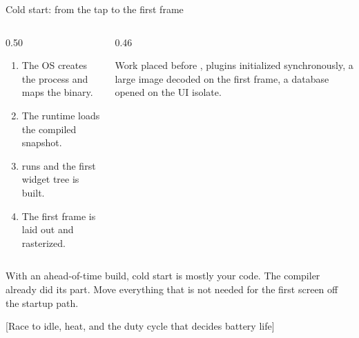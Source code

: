 \documentclass[10pt,aspectratio=169,t]{beamer}
\begin{document}
\begin{frame}[eyebrow=Compilation]{Cold start: from the tap to the first frame}
  \vskip 2mm
  \begin{columns}[T]
    \begin{column}{0.50\textwidth}
      \begin{enumerate}
        \item The OS creates the process and maps the binary.
        \item The runtime loads the compiled snapshot.
        \item {} runs and the first widget tree is built.
        \item The first frame is laid out and rasterized.
      \end{enumerate}
    \end{column}
    \begin{column}{0.46\textwidth}
      \begin{hint}
        Work placed before , plugins initialized synchronously, a large image decoded on the first frame, a database opened on the UI isolate.
      \end{hint}
    \end{column}
  \end{columns}
  \begin{takeaway}{With an ahead-of-time build, cold start is mostly your code.}
    The compiler already did its part. Move everything that is not needed for the first screen off the startup path.
  \end{takeaway}
\end{frame}

[Race to idle, heat, and the duty cycle that decides battery life]
\end{document}
